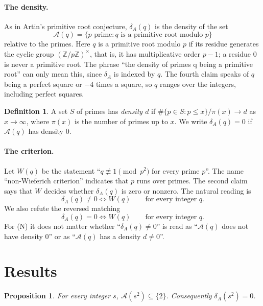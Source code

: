 \documentclass[11pt]{article}
\theoremstyle{plain}
\newtheorem{proposition}[theorem]{Proposition}
\theoremstyle{definition}
\newtheorem{definition}[theorem]{Definition}
\theoremstyle{remark}
\newcommand{\Z}{\mathbb Z}
\begin{document}
\paragraph{The density.} As in Artin's primitive root conjecture, $\delta_A(q)$ is
the density of the set
\[
\mathcal A(q)=\{p \text{ prime}: q \text{ is a primitive root modulo } p\}
\]
relative to the primes. Here $q$ is a primitive root modulo $p$ if its residue
generates the cyclic group $(\Z/p\Z)^\times$, that is, it has multiplicative order
$p-1$; a residue $0$ is never a primitive root. The phrase ``the density of primes q
being a primitive root'' can only mean this, since $\delta_A$ is indexed by $q$. The
fourth claim speaks of $q$ being a perfect square or $-4$ times a square, so $q$
ranges over the integers, including perfect squares.

\begin{definition}
A set $S$ of primes has \emph{density $d$} if
$\#\{p\in S: p\le x\}/\pi(x)\to d$ as $x\to\infty$, where $\pi(x)$ is the number of
primes up to $x$. We write $\delta_A(q)=0$ if $\mathcal A(q)$ has density $0$.
\end{definition}

\paragraph{The criterion.} Let $W(q)$ be the statement ``$q\not\equiv1\pmod{p^2}$
for every prime $p$''. The name ``non-Wieferich criterion'' indicates that $p$ runs
over primes. The second claim says that $W$ decides whether $\delta_A(q)$ is zero or
nonzero. The natural reading is
\begin{equation}\label{eq:N}
\delta_A(q)\ne0 \iff W(q)\qquad\text{for every integer } q. \tag{N}
\end{equation}
We also refute the reversed matching
\begin{equation}\label{eq:Z}
\delta_A(q)=0 \iff W(q)\qquad\text{for every integer } q. \tag{Z}
\end{equation}
For (N) it does not matter whether ``$\delta_A(q)\ne0$'' is read as ``$\mathcal
A(q)$ does not have density $0$'' or as ``$\mathcal A(q)$ has a density $d\ne0$''.

\section{Results}

\begin{proposition}\label{prop:square}
For every integer $s$, $\mathcal A(s^2)\subseteq\{2\}$. Consequently
$\delta_A(s^2)=0$.
\end{proposition}
\end{document}
